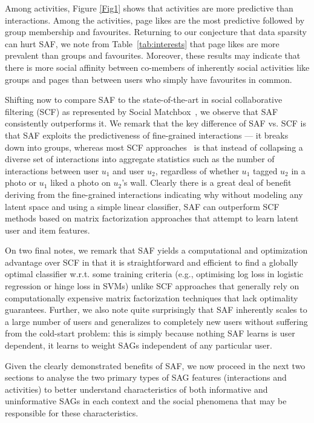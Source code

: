 Among activities, Figure \ref{Fig1} shows that activities are more
predictive than interactions. Among the activities, page likes are the
most predictive followed by group membership and favourites.
Returning to our conjecture that data sparsity can hurt SAF, we note
from Table~\ref{tab:interests} that page likes are more prevalent than
groups and favourites.  Moreover, these results may indicate that
there is more social affinity between co-members of inherently social
activities like groups and pages than between users who simply have
favourites in common.

Shifting now to compare SAF to the state-of-the-art in social
collaborative filtering (SCF) as represented by Social
Matchbox~\cite{Noel2012NOF}, we observe that SAF consistently
outperforms it.  We remark that the key difference of SAF vs. SCF is
that SAF exploits the predictiveness of fine-grained interactions ---
it breaks down into groups, whereas most SCF
approaches~\cite{lla,socinf,sr,rrmf,spectral,sorec,ste} is that
instead of collapsing a diverse set of interactions into aggregate
statistics such as the number of interactions between user $u_1$ and
user $u_2$, regardless of whether $u_1$ tagged $u_2$ in a photo or
$u_1$ liked a photo on $u_2$'s wall.  Clearly there is a great deal of
benefit deriving from the fine-grained interactions indicating why
without modeling any latent space and using a simple linear
classifier, SAF can outperform SCF methods based on matrix
factorization approaches that attempt to learn latent user and item
features.

On two final notes, we remark that SAF yields a computational and
optimization advantage over SCF in that it is straightforward and
efficient to find a globally optimal classifier w.r.t. some training
criteria (e.g., optimising log loss in logistic regression or hinge
loss in SVMs) unlike SCF approaches that generally rely on
computationally expensive matrix factorization techniques that lack
optimality guarantees.  Further, we also note quite surprisingly that
SAF inherently scales to a large number of users and generalizes to
completely new users without suffering from the cold-start problem:
this is simply because nothing SAF learns is user dependent, it learns
to weight SAGs independent of any particular user.

Given the clearly demonstrated benefits of SAF, we now proceed in the
next two sections to analyse the two primary types of SAG features
(interactions and activities) to better understand characteristics of
both informative and uninformative SAGs in each context and the social
phenomena that may be responsible for these characteristics.

